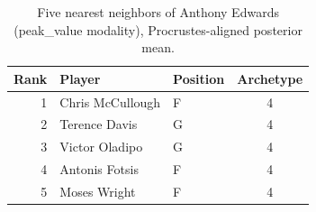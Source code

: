\begin{table}[htbp]
  \centering\small
  \begin{tabular}{rllc}
    \toprule
    Rank & Player & Position & Archetype \\
    \midrule
    1 & Chris McCullough & F & 4 \\
    2 & Terence Davis & G & 4 \\
    3 & Victor Oladipo & G & 4 \\
    4 & Antonis Fotsis & F & 4 \\
    5 & Moses Wright & F & 4 \\
    \bottomrule
  \end{tabular}
  \caption{Five nearest neighbors of Anthony Edwards (peak_value modality), Procrustes-aligned posterior mean.}
  \label{tab:Anthony_Edwards_neighbors_peak_value}
\end{table}


